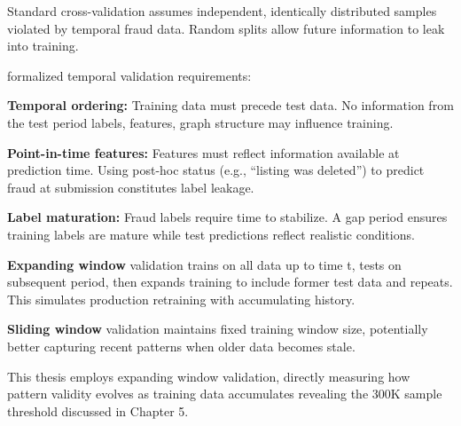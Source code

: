 Standard cross-validation assumes independent, identically distributed samples violated by temporal fraud data. Random splits allow future information to leak into training.

\citeauthor{dalpozzolo2017credit} \cite{dalpozzolo2017credit} formalized temporal validation requirements:

\textbf{Temporal ordering:} Training data must precede test data. No information from the test period labels, features, graph structure may influence training.

\textbf{Point-in-time features:} Features must reflect information available at prediction time. Using post-hoc status (e.g., ``listing was deleted'') to predict fraud at submission constitutes label leakage.

\textbf{Label maturation:} Fraud labels require time to stabilize. A gap period ensures training labels are mature while test predictions reflect realistic conditions.

\textbf{Expanding window} validation trains on all data up to time t, tests on subsequent period, then expands training to include former test data and repeats. This simulates production retraining with accumulating history.

\textbf{Sliding window} validation maintains fixed training window size, potentially better capturing recent patterns when older data becomes stale.

This thesis employs expanding window validation, directly measuring how pattern validity evolves as training data accumulates revealing the 300K sample threshold discussed in Chapter 5.

